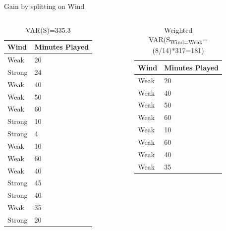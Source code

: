 \documentclass[usenames,dvipsnames]{beamer}
\begin{document}
\begin{frame}{Gain by splitting on Wind}
\begin{columns}
\begin{column}{.5\textwidth}
\begin{scriptsize}
\begin{table}[]
	\begin{tabular}{@{}ll@{}}
		\toprule
		\textbf{Wind} & \textbf{Minutes Played} \\ \midrule
		Weak          & 20                      \\
		Strong        & 24                      \\
		Weak          & 40                      \\
		Weak          & 50                      \\
		Weak          & 60                      \\
		Strong        & 10                      \\
		Strong        & 4                       \\
		Weak          & 10                      \\
		Weak          & 60                      \\
		Weak          & 40                      \\
		Strong        & 45                      \\
		Strong        & 40                      \\
		Weak          & 35                      \\
		Strong        & 20                      \\ \bottomrule
	\end{tabular}
\caption{VAR(S)=335.3}
\end{table}
	\end{scriptsize}
\end{column}
\begin{column}{.5\textwidth}
	\begin{scriptsize}
\vspace{-25pt}		
\begin{table}[]
	\begin{tabular}{@{}ll@{}}
		\toprule
		\textbf{Wind} & \textbf{Minutes Played} \\ \midrule
		Weak          & 20                      \\
		Weak          & 40                      \\
		Weak          & 50                      \\
		Weak          & 60                      \\
		Weak          & 10                      \\
		Weak          & 60                      \\
		Weak          & 40                      \\
		Weak          & 35                      \\ \bottomrule
	\end{tabular}
\caption{Weighted VAR(S\textsubscript{Wind=Weak}=(8/14)*317=181)}
\end{table}
\vspace{-25pt}
	\end{scriptsize}


\end{column}
\end{columns}
\end{frame}
\end{document}
